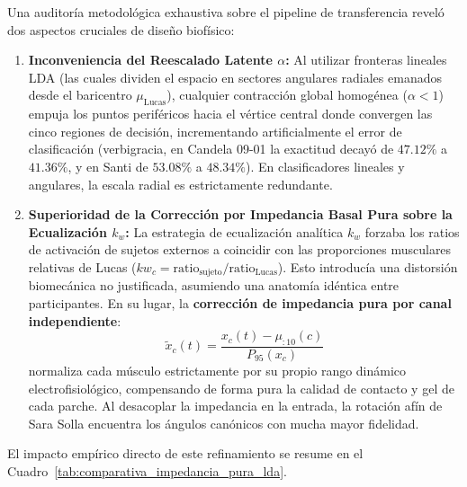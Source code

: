 \documentclass[11pt,a4paper]{article}
\begin{document}
Una auditoría metodológica exhaustiva sobre el pipeline de transferencia reveló dos aspectos cruciales de diseño biofísico:
\begin{enumerate}
    \item \textbf{Inconveniencia del Reescalado Latente $\alpha$:} Al utilizar fronteras lineales LDA (las cuales dividen el espacio en sectores angulares radiales emanados desde el baricentro $\mu_{\text{Lucas}}$), cualquier contracción global homogénea ($\alpha < 1$) empuja los puntos periféricos hacia el vértice central donde convergen las cinco regiones de decisión, incrementando artificialmente el error de clasificación (verbigracia, en Candela 09-01 la exactitud decayó de $47.12\%$ a $41.36\%$, y en Santi de $53.08\%$ a $48.34\%$). En clasificadores lineales y angulares, la escala radial es estrictamente redundante.
    \item \textbf{Superioridad de la Corrección por Impedancia Basal Pura sobre la Ecualización $k_w$:} La estrategia de ecualización analítica $k_w$ forzaba los ratios de activación de sujetos externos a coincidir con las proporciones musculares relativas de Lucas ($kw_c = \text{ratio}_{\text{sujeto}} / \text{ratio}_{\text{Lucas}}$). Esto introducía una distorsión biomecánica no justificada, asumiendo una anatomía idéntica entre participantes. En su lugar, la \textbf{corrección de impedancia pura por canal independiente}:
    \begin{equation}
        \tilde{x}_c(t) = \frac{x_c(t) - \mu_{:10}(c)}{P_{95}(x_c)}
    \end{equation}
    normaliza cada músculo estrictamente por su propio rango dinámico electrofisiológico, compensando de forma pura la calidad de contacto y gel de cada parche. Al desacoplar la impedancia en la entrada, la rotación afín de Sara Solla encuentra los ángulos canónicos con mucha mayor fidelidad.
\end{enumerate}

El impacto empírico directo de este refinamiento se resume en el Cuadro~\ref{tab:comparativa_impedancia_pura_lda}.
\end{document}
